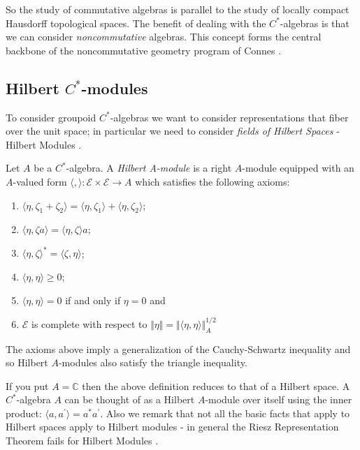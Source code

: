 So the study of commutative algebras is parallel to the study of locally compact Hausdorff topological spaces. The benefit of dealing with the $C^{*}$-algebras is that we can consider \textit{noncommutative} algebras. This concept forms the central backbone of the noncommutative geometry program of Connes \cite{MR1826266}.

\subsection{Hilbert $C^{*}$-modules}
To consider groupoid $C^{*}$-algebras we want to consider representations that fiber over the unit space; in particular we need to consider \textit{fields of Hilbert Spaces} - Hilbert Modules \cite{MR1325694}.

\begin{definition}
Let $A$ be a $C^{*}$-algebra. A \textit{Hilbert A-module}  is a right $A$-module equipped with an $A$-valued form $\langle , \rangle: \mathscr{E} \times \mathscr{E} \rightarrow A$ which satisfies the following axioms:
\begin{enumerate}
\item $\langle \eta ,\zeta_{1} + \zeta_{2} \rangle = \langle \eta , \zeta_{1}\rangle + \langle \eta ,\zeta_{2} \rangle$;
\item $\langle \eta , \zeta a \rangle = \langle \eta ,\zeta \rangle a$;
\item $\langle \eta , \zeta \rangle^{*} = \langle \zeta ,\eta \rangle$;
\item $\langle \eta, \eta \rangle \geq 0$;
\item $\langle \eta ,\eta  \rangle = 0 $ if and only if $ \eta = 0$ and
\item $\mathscr{E}$ is complete with respect to $\Vert \eta \Vert = \Vert \langle \eta , \eta \rangle \Vert_{A}^{1/2}$
\end{enumerate}
\end{definition}

\begin{remark}
The axioms above imply a generalization of the Cauchy-Schwartz inequality and so Hilbert $A$-modules also satisfy the triangle inequality.
\end{remark}

\begin{remark}
If you put $A= \mathbb{C}$ then the above definition reduces to that of a Hilbert space. A $C^{*}$-algebra $A$ can be thought of as a Hilbert $A$-module over itself using the inner product: $\langle a, a^{'} \rangle = a^{*}a^{'}$. Also we remark that not all the basic facts that apply to Hilbert spaces apply to Hilbert modules - in general the Riesz Representation Theorem fails for Hilbert Modules \cite{MR1077390}.
\end{remark}

